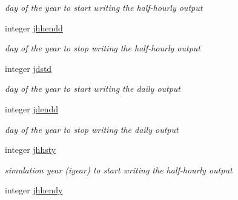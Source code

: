 \begin{DoxyCompactItemize}
\begin{DoxyCompactList}\small\item\em day of the year to start writing the half-\/hourly output \end{DoxyCompactList}\item 
\hypertarget{structctem__statevars_1_1ctem__switches_a2813ec6a413fa5eb8e2fff6ceabaac44}{}integer \hyperlink{structctem__statevars_1_1ctem__switches_a2813ec6a413fa5eb8e2fff6ceabaac44}{jhhendd}\label{structctem__statevars_1_1ctem__switches_a2813ec6a413fa5eb8e2fff6ceabaac44}

\begin{DoxyCompactList}\small\item\em day of the year to stop writing the half-\/hourly output \end{DoxyCompactList}\item 
\hypertarget{structctem__statevars_1_1ctem__switches_a9bb7c1a382d3330f6ed39d105b297046}{}integer \hyperlink{structctem__statevars_1_1ctem__switches_a9bb7c1a382d3330f6ed39d105b297046}{jdstd}\label{structctem__statevars_1_1ctem__switches_a9bb7c1a382d3330f6ed39d105b297046}

\begin{DoxyCompactList}\small\item\em day of the year to start writing the daily output \end{DoxyCompactList}\item 
\hypertarget{structctem__statevars_1_1ctem__switches_a2932ff768713c957e4f1017e433be692}{}integer \hyperlink{structctem__statevars_1_1ctem__switches_a2932ff768713c957e4f1017e433be692}{jdendd}\label{structctem__statevars_1_1ctem__switches_a2932ff768713c957e4f1017e433be692}

\begin{DoxyCompactList}\small\item\em day of the year to stop writing the daily output \end{DoxyCompactList}\item 
\hypertarget{structctem__statevars_1_1ctem__switches_ac3e40351b17879c7bd7011862e754547}{}integer \hyperlink{structctem__statevars_1_1ctem__switches_ac3e40351b17879c7bd7011862e754547}{jhhsty}\label{structctem__statevars_1_1ctem__switches_ac3e40351b17879c7bd7011862e754547}

\begin{DoxyCompactList}\small\item\em simulation year (iyear) to start writing the half-\/hourly output \end{DoxyCompactList}\item 
\hypertarget{structctem__statevars_1_1ctem__switches_ac383edb2471670ad46107d36ce5359a0}{}integer \hyperlink{structctem__statevars_1_1ctem__switches_ac383edb2471670ad46107d36ce5359a0}{jhhendy}\label{structctem__statevars_1_1ctem__switches_ac383edb2471670ad46107d36ce5359a0}


\end{DoxyCompactItemize}

